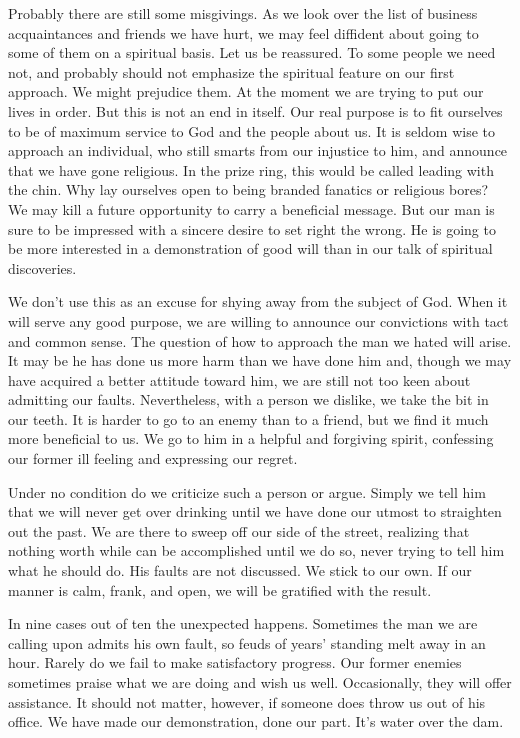 \begin{biblechapter}
Probably there are still some misgivings.  As we look over the list of business acquaintances and friends we have hurt, we may feel diffident about going to some of them on a spiritual basis.  Let us be reassured.  To some people we need not, and probably should not emphasize the spiritual feature on our first approach.  We might prejudice them.  At the moment we are trying to put our lives in order.  But this is not an end in itself.  Our real purpose is to fit ourselves to be of maximum service to God and the people about us.  It is seldom wise to approach an individual, who still smarts from our injustice to him, and announce that we have gone religious.  In the prize ring, this would be called leading with the chin.  Why lay ourselves open to being branded fanatics or religious bores?  We may kill a future opportunity to carry a beneficial message.  But our man is sure to be impressed with a sincere desire to set right the wrong.  He is going to be more interested in a demonstration of good will than in our talk of spiritual discoveries.

We don't use this as an excuse for shying away from the subject of God.  When it will serve any good purpose, we are willing to announce our convictions with tact and common sense.  The question of how to approach the man we hated will arise.  It may be he has done us more harm than we have done him and, though we may have acquired a better attitude toward him, we are still not too keen about admitting our faults.  Nevertheless, with a person we dislike, we take the bit in our teeth.  It is harder to go to an enemy than to a friend, but we find it much more beneficial to us.  We go to him in a helpful and forgiving spirit, confessing our former ill feeling and expressing our regret.

Under no condition do we criticize such a person or argue.  Simply we tell him that we will never get over drinking until we have done our utmost to straighten out the past.  We are there to sweep off our side of the street, realizing that nothing worth while can be accomplished until we do so, never trying to tell him what he should do.  His faults are not discussed.  We stick to our own.  If our manner is calm, frank, and open, we will be gratified with the result.

In nine cases out of ten the unexpected happens.  Sometimes the man we are calling upon admits his own fault, so feuds of years' standing melt away in an hour.  Rarely do we fail to make satisfactory progress.  Our former enemies sometimes praise what we are doing and wish us well.  Occasionally, they will offer assistance.  It should not matter, however, if someone does throw us out of his office.  We have made our demonstration, done our part.  It's water over the dam.


\end{biblechapter}
